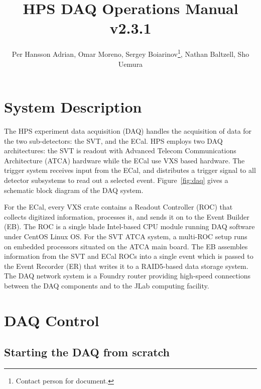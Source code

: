 \documentclass[12pt]{article}
\title{HPS DAQ Operations Manual v2.3.1}
\author{Per Hansson Adrian, Omar Moreno, Sergey Boiarinov\thanks{Contact person for document.}, Nathan Baltzell, Sho Uemura }
\begin{document}
\maketitle

\tableofcontents

\section{System Description}
The HPS experiment data acquisition (DAQ) handles the acquisition of data for the two sub-detectors: the SVT,  and the ECal. HPS employs two DAQ architectures: the SVT is readout with Advanced Telecom Communications Architecture (ATCA) hardware while the ECal use VXS based hardware. The trigger system receives input from the ECal, and distributes a trigger signal to all detector subsystems to read out a selected event. Figure~\ref{fig:daq} gives a schematic block diagram of the DAQ system.

For the ECal, every VXS crate contains a Readout Controller (ROC) that collects digitized information, processes it, and sends it on to the Event Builder (EB). The ROC is a single blade Intel-based CPU module running DAQ software under CentOS Linux OS. For the SVT ATCA system, a multi-ROC setup runs on embedded processors situated on the ATCA main board. The EB assembles information from the SVT and ECal ROCs into a single event which is passed to the Event Recorder (ER) that writes it to a RAID5-based data storage system. The DAQ network system is a Foundry router providing high-speed connections between the DAQ components and to the JLab computing facility. 

\newpage
\section{DAQ Control}
\label{sec:daq_control}

\subsection{Starting the DAQ from scratch}\label{sec:daqstart}
\end{document}

